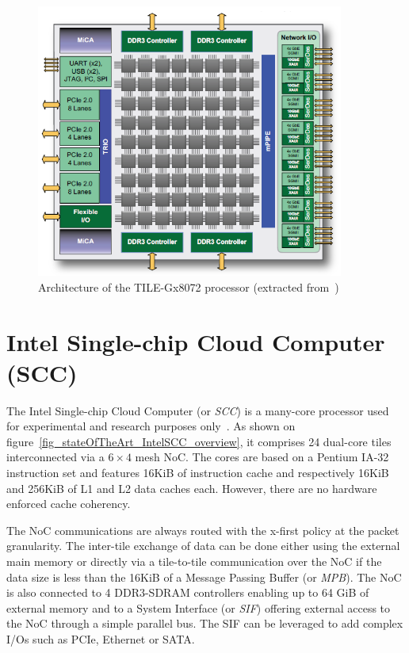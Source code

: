 \documentclass[main.tex]{subfiles}
\begin{document}
\begin{figure}
    \centering
    \includegraphics[height=9cm]{imgs/png/stateOfTheArt_TILEGx72_overview.png}
    \caption{Architecture of the TILE-Gx8072 processor (extracted from~\cite{TileGx})}
    \label{fig_stateOfTheArt_TILEGx72_overview}
\end{figure}



\section{Intel Single-chip Cloud Computer (SCC)}
The Intel Single-chip Cloud Computer (or \emph{SCC}) is a many-core processor used for experimental and research purposes only~\cite{intel_scc}. As shown on figure~\ref{fig_stateOfTheArt_IntelSCC_overview}, it comprises 24 dual-core tiles interconnected via a $6 \times 4$ mesh NoC. The cores are based on a Pentium IA-32 instruction set and features 16KiB of instruction cache and respectively 16KiB and 256KiB of L1 and L2 data caches each. However, there are no hardware enforced cache coherency. 

The NoC communications are always routed with the x-first policy at the packet granularity. The inter-tile exchange of data can be done either using the external main memory or directly via a tile-to-tile communication over the NoC if the data size is less than the 16KiB of a Message Passing Buffer (or \emph{MPB}). 
The NoC is also connected to 4 DDR3-SDRAM controllers enabling up to 64 GiB of external memory and to a System Interface (or \emph{SIF}) offering external access to the NoC through a simple parallel bus. The SIF can be leveraged to add complex I/Os such as PCIe, Ethernet or SATA.
\end{document}
